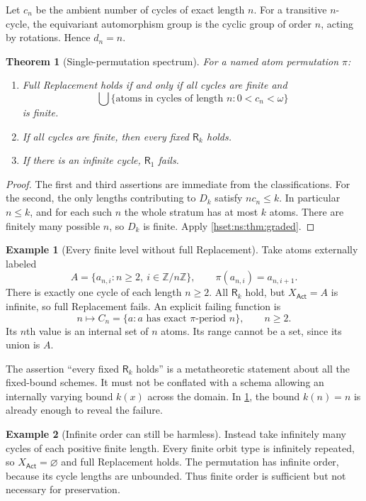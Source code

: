 \documentclass[11pt,letterpaper]{article}
\newtheorem{theorem}{Theorem}[section]
\theoremstyle{definition}
\newtheorem{example}[example]{Example}\aliascntresetthe{example}
\theoremstyle{remark}
\newcommand{\Act}{\mathsf{Act}}
\begin{document}
Let $c_n$ be the ambient number of cycles of exact length $n$. For a transitive $n$-cycle, the equivariant automorphism group is the cyclic group of order $n$, acting by rotations. Hence $d_n=n$.

\begin{theorem}[Single-permutation spectrum]\label{hset:ns:thm:single}
For a named atom permutation $\pi$:
\begin{enumerate}
\item Full Replacement holds if and only if all cycles are finite and
\[
 \bigcup\{\text{atoms in cycles of length }n:0<c_n<\omega\}
\]
is finite.
\item If all cycles are finite, then every fixed $\mathsf R_k$ holds.
\item If there is an infinite cycle, $\mathsf R_1$ fails.
\end{enumerate}
\end{theorem}
\begin{proof}
The first and third assertions are immediate from the classifications. For the second, the only lengths contributing to $D_k$ satisfy $nc_n\le k$. In particular $n\le k$, and for each such $n$ the whole stratum has at most $k$ atoms. There are finitely many possible $n$, so $D_k$ is finite. Apply \cref{hset:ns:thm:graded}.
\end{proof}

\begin{example}[Every finite level without full Replacement]\label{hset:ns:ex:limit}
Take atoms externally labeled
\[
 A=\{a_{n,i}:n\ge2,\ i\in\mathbb Z/n\mathbb Z\},\qquad
 \pi(a_{n,i})=a_{n,i+1}.
\]
There is exactly one cycle of each length $n\ge2$. All $\mathsf R_k$ hold, but $X_{\Act}=A$ is infinite, so full Replacement fails. An explicit failing function is
\[
 n\longmapsto C_n=\{a:\text{$a$ has exact $\pi$-period $n$}\},\qquad n\ge2.
\]
Its $n$th value is an internal set of $n$ atoms. Its range cannot be a set, since its union is $A$.
\end{example}

The assertion ``every fixed $\mathsf R_k$ holds'' is a metatheoretic statement about all the fixed-bound schemes. It must not be conflated with a schema allowing an internally varying bound $k(x)$ across the domain. In \cref{hset:ns:ex:limit}, the bound $k(n)=n$ is already enough to reveal the failure.

\begin{example}[Infinite order can still be harmless]\label{hset:ns:ex:safe}
Instead take infinitely many cycles of each positive finite length. Every finite orbit type is infinitely repeated, so $X_{\Act}=\varnothing$ and full Replacement holds. The permutation has infinite order, because its cycle lengths are unbounded. Thus finite order is sufficient but not necessary for preservation.
\end{example}
\end{document}
